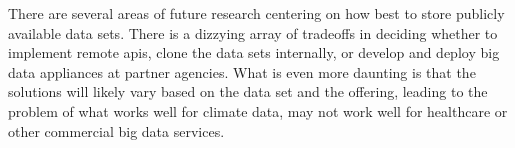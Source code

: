 There are several areas of future research centering on how best to store publicly available data sets. There is a dizzying array of tradeoffs in deciding whether to implement remote \gls{api}s, clone the data sets internally, or develop and deploy big data appliances at partner agencies. What is even more daunting is that the solutions will likely vary based on the data set and the offering, leading to the problem of what works well for climate data, may not work well for healthcare or other commercial big data services.\\